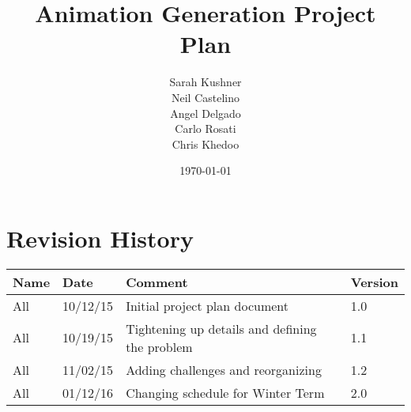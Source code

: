 \documentclass{article}
\begin{document}
\title{Animation Generation Project Plan}
\author{Sarah Kushner \\
		Neil Castelino \\
		Angel Delgado \\
		Carlo Rosati \\
		Chris Khedoo}
\date{\today}
\maketitle

\pagebreak
\tableofcontents
\pagebreak

\section{Revision History}
\begin{table}[hp]
\centering
\begin{tabular}{|l|l|l|l|}
\hline
Name 		& Date	 		& 	Comment	 								& 	Version	 \\ \hline
All		& 10/12/15		& 	Initial project plan document			&  	1.0 		 \\ \hline
All		& 10/19/15		& 	Tightening up details and defining the problem			&  	1.1 		 \\ \hline
All		& 11/02/15		& 	Adding challenges and reorganizing			&  	1.2 		 \\ \hline
All		& 01/12/16		& 	Changing schedule for Winter Term			&  	2.0 		 \\ \hline
\end{tabular}
\end{table}

\pagebreak
















\end{document}
